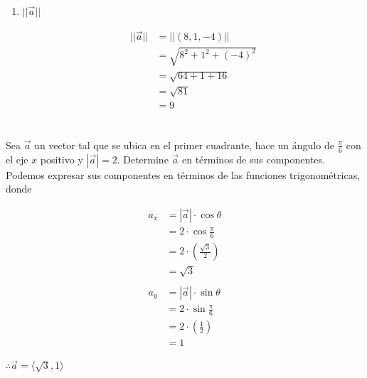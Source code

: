 \documentclass[12pt]{article}
\begin{document}
\begin{enumerate}
\item $||\vec{a}||$
  
  \begin{equation*}
    \begin{split}
      ||\vec{a}|| &= ||(8, 1, -4)|| \\
      &= \sqrt{8^2 + 1^2 + (-4)^2} \\
      &= \sqrt{64 + 1 + 16} \\
      &= \sqrt{81} \\
      &= 9
    \end{split}
  \end{equation*}
  
\end{enumerate}

\section{}

Sea $\vec{a}$ un vector tal que se ubica en el primer cuadrante, hace un ángulo de $\frac{\pi}{6}$ con el eje $x$ positivo  y $|\vec{a}|=2$. Determine $\vec{a}$ en términos de sus componentes. \\

Podemos expresar sus componentes en términos de las funciones trigonométricas, donde

\begin{align*}
  a_x​ &= |\vec{a}| \cdot \cos{\theta} \\
  &= 2 \cdot \cos{\frac{\pi}{6}} \\
  &= 2 \cdot \left( \frac{\sqrt{3}}{2} \right) \\
  &= \sqrt{3} \\ \\
  a_y &= |\vec{a}| \cdot \sin{\theta} \\
  &= 2 \cdot \sin{\frac{\pi}{6}} \\
  &= 2 \cdot \left( \frac{1}{2} \right) \\
  &= 1 
\end{align*}

$\therefore \vec{a} = \langle \sqrt{3}, 1 \rangle$

\section{}
\end{document}
